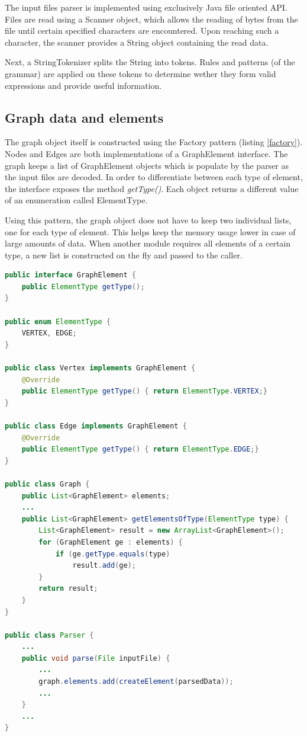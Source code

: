 The input files parser is implemented using exclusively Java file oriented API. Files are read using a Scanner object, 
which allows the reading of bytes from the file until certain specified characters are encountered. Upon reaching 
such a character, the scanner provides a String object containing the read data. 

Next, a StringTokenizer splits the String into tokens. Rules and patterns (of the grammar) are applied on these tokens 
to determine wether they form valid expressions and provide useful information.

\subsection{Graph data and elements}

The graph object itself is constructed using the Factory pattern (listing \ref{factory}). Nodes and Edges are both implementations of a 
GraphElement interface. The graph keeps a list of GraphElement objects which is populate by the parser as the input 
files are decoded. In order to differentiate between each type of element, the interface exposes the method 
\emph{getType()}. Each object returns a different value of an enumeration called ElementType. 

Using this pattern, the graph object does not have to keep two individual lists, one for each type of element. This 
helps keep the memory usage lower in case of large amounts of data. When another module requires all elements of a 
certain type, a new list is constructed on the fly and passed to the caller.

\begin{lstlisting}[caption=Basic class structure for factory implementation \label{factory}, language=Java ]
public interface GraphElement {
	public ElementType getType();
}

public enum ElementType {
	VERTEX, EDGE;
}

public class Vertex implements GraphElement {
	@Override
	public ElementType getType() { return ElementType.VERTEX;}
}

public class Edge implements GraphElement {
	@Override
	public ElementType getType() { return ElementType.EDGE;}
}

public class Graph {
	public List<GraphElement> elements;
	...
	public List<GraphElement> getElementsOfType(ElementType type) {
		List<GraphElement> result = new ArrayList<GraphElement>();
		for (GraphElement ge : elements) {
			if (ge.getType.equals(type)
				result.add(ge);
		}
		return result;
	}
}

public class Parser {
	...
	public void parse(File inputFile) {
		...
		graph.elements.add(createElement(parsedData));
		...
	}
	...
}

\end{lstlisting}

